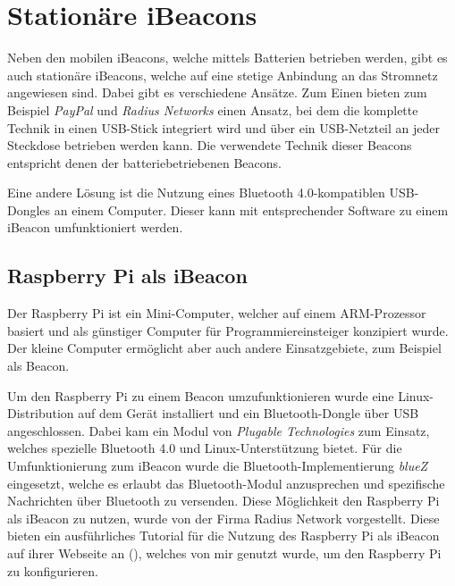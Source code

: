 \section{Stationäre iBeacons}
\label{sec:dataandmeasurement:stationarybeacon}
Neben den mobilen iBeacons, welche mittels Batterien betrieben werden, gibt es auch stationäre iBeacons, welche auf eine stetige Anbindung an das Stromnetz angewiesen sind.
Dabei gibt es verschiedene Ansätze.
Zum Einen bieten zum Beispiel \emph{PayPal} und \emph{Radius Networks} einen Ansatz, bei dem die komplette Technik in einen USB-Stick integriert wird und über ein USB-Netzteil an jeder Steckdose betrieben werden kann. Die verwendete Technik dieser Beacons entspricht denen der batteriebetriebenen Beacons.

Eine andere Lösung ist die Nutzung eines Bluetooth 4.0-kompatiblen USB-Dongles an einem Computer. Dieser kann mit entsprechender Software zu einem iBeacon umfunktioniert werden.

\subsection{Raspberry Pi als iBeacon}
\label{sec:dataandmeasurement:stationarybeacon:raspberrypi}
Der Raspberry Pi ist ein Mini-Computer, welcher auf einem ARM-Prozessor basiert und als günstiger Computer für Programmiereinsteiger konzipiert wurde. Der kleine Computer ermöglicht aber auch andere Einsatzgebiete, zum Beispiel als Beacon.

Um den Raspberry Pi zu einem Beacon umzufunktionieren wurde eine Linux-Distribution auf dem Gerät installiert und ein Bluetooth-Dongle über USB angeschlossen. Dabei kam ein Modul von \emph{Plugable Technologies} zum Einsatz, welches spezielle Bluetooth 4.0 und Linux-Unterstützung bietet.
Für die Umfunktionierung zum iBeacon wurde die Bluetooth-Implementierung \emph{blueZ} eingesetzt, welche es erlaubt das Bluetooth-Modul anzusprechen und spezifische Nachrichten über Bluetooth zu versenden.
Diese Möglichkeit den Raspberry Pi als iBeacon zu nutzen, wurde von der Firma Radius Network vorgestellt. Diese bieten ein ausführliches Tutorial für die Nutzung des Raspberry Pi als iBeacon auf ihrer Webseite an (\citet{radiusraspberry}), welches von mir genutzt wurde, um den Raspberry Pi zu konfigurieren.


